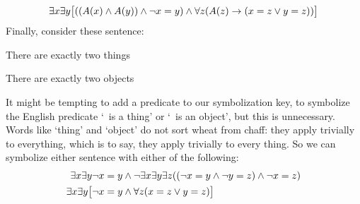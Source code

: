 $$\exists x\exists y\bigl[((\mathord{A}(x) \wedge \mathord{A}(y)) \wedge \neg x = y) \wedge \forall z(\mathord{A}(z) \rightarrow ( x= z \vee y = z))\bigr]$$
Finally, consider these sentence:
\begin{earg}
\item[\ex{exactly2things}] There are exactly two things
\item[\ex{exactly2objects}] There are exactly two objects
\end{earg}
It might be tempting to add a predicate to our symbolization key, to symbolize the English predicate `\blank\ is a thing' or `\blank\ is an object', but this is unnecessary. Words like `thing' and `object' do not sort wheat from chaff: they apply trivially to everything, which is to say, they apply trivially to every thing. So we can symbolize either sentence with either of the following:
	\begin{align*}
		\exists x \exists y \neg x = y & \wedge  \neg \exists x \exists y \exists z ((\neg x = y \wedge \neg y = z) \wedge \neg x = z) \\
		\exists x \exists y \bigl[\neg x = y & \wedge \forall z(x=z \vee y = z)\bigr]
	\end{align*}

\practiceproblems


